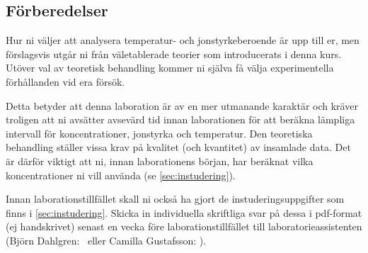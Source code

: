 \subsection{Förberedelser}
Hur ni väljer att analysera temperatur- och jonstyrkeberoende är
upp till er, men förslagsvis utgår ni från väletablerade
teorier som introducerats i denna kurs. Utöver val av teoretisk behandling
kommer ni själva få välja experimentella förhållanden vid era försök.

Detta betyder att denna laboration är av en mer utmanande karaktär och
kräver troligen att ni avsätter avsevärd tid innan laborationen för att
beräkna lämpliga intervall för koncentrationer, jonstyrka och
temperatur. Den teoretiska behandling ställer vissa krav på kvalitet (och
kvantitet) av insamlade data. Det är därför viktigt att ni, innan
laborationens början, har beräknat vilka koncentrationer ni vill
använda (se \cref{sec:instudering}).

Innan laborationstillfället skall ni också ha gjort de
instuderingsuppgifter som finns i \cref{sec:instudering}. Skicka in
individuella skriftliga svar på dessa i pdf-format (ej handskrivet)
senast en vecka före laborationstillfället till 
laboratorieassistenten (Björn Dahlgren: \mailtobjorn\ eller Camilla
Gustafsson: \mailtocamilla).

